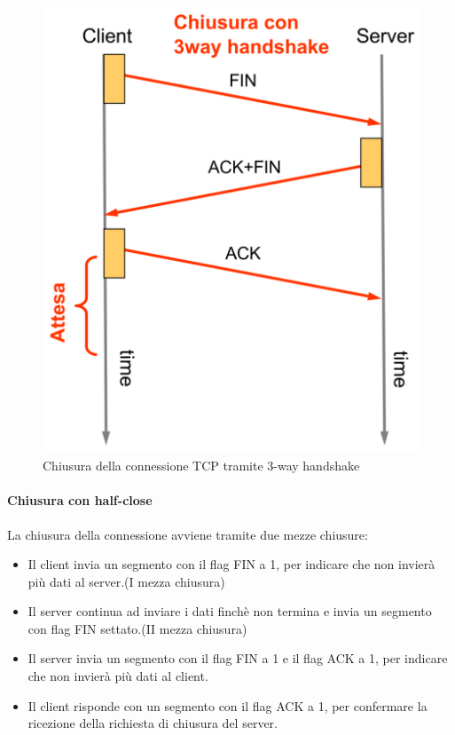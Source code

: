 \begin{figure}[h!]
\begin{minipage}{0.48\textwidth}
        \includegraphics[width=\textwidth]{images/3wayclose.png}
        \caption{Chiusura della connessione TCP tramite 3-way handshake}
        \label{fig:3wayclose}
    \end{minipage}
\end{figure}

\paragraph{Chiusura con half-close}
La chiusura della connessione avviene tramite due mezze chiusure:
\begin{itemize}
    \item Il client invia un segmento con il flag FIN a 1, per indicare che non invierà più dati al server.(I mezza chiusura) 
    \item Il server continua ad inviare i dati finchè non termina e invia un segmento con flag FIN settato.(II mezza chiusura)
    \item Il server invia un segmento con il flag FIN a 1 e il flag ACK a 1, per indicare che non invierà più dati al client. 
    \item Il client risponde con un segmento con il flag ACK a 1, per confermare la ricezione della richiesta di chiusura del server. 
\end{itemize} 


